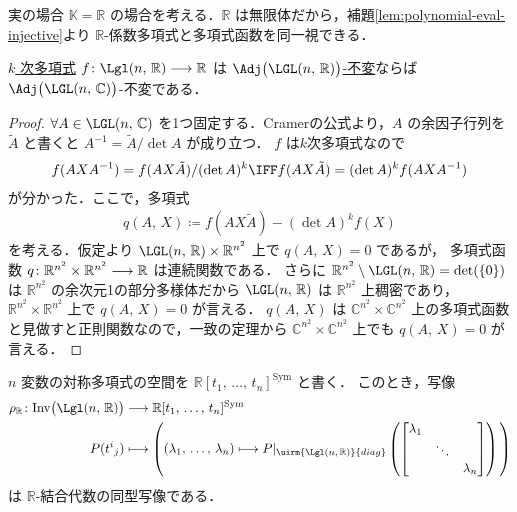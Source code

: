 \documentclass[TQFT_main]{subfiles}
\begin{document}
\begin{myexample}[label=case:real]{実の場合}
    $\mathbb{K} = \mathbb{R}$ の場合を考える．$\mathbb{R}$ は無限体だから，補題\ref{lem:polynomial-eval-injective}より $\mathbb{R}$-係数多項式と多項式函数を同一視できる．

    \begin{mylem}[label=lem:RtoC]{}
        \hyperref[def:polynomial]{$k$ 次多項式} $f \colon \Lgl(n,\, \mathbb{R}) \lto \mathbb{R}$ は
        \hyperref[def:invariant]{$\Adj\bigl(\LGL(n,\, \mathbb{R})\bigr)$-不変}ならば
        $\Adj\bigl(\LGL(n,\, \mathbb{C})\bigr)$-不変である．
    \end{mylem}
    
    \begin{proof}
        $\forall A \in \LGL(n,\, \mathbb{C})$ を1つ固定する．Cramerの公式より，$A$ の余因子行列を $\tilde{A}$ と書くと $A^{-1} = \tilde{A}/\det A$ が成り立つ．
        $f$ は$k$次多項式なので
        \begin{align}
            f(AXA^{-1}) = f(AX \tilde{A}) / (\det A)^k \IFF f(AX \tilde{A}) = (\det A)^k f(AXA^{-1})
        \end{align}
        が分かった．ここで，多項式
        \begin{align}
            q(A,\, X) \coloneqq f(AX\tilde{A}) - (\det A)^k f(X)
        \end{align}
        を考える．仮定より $\LGL(n,\, \mathbb{R}) \times \mathbb{R}^{n^2}$ 上で $q(A,\, X) = 0$ であるが，
        多項式函数 $q \colon \mathbb{R}^{n^2} \times \mathbb{R}^{n^2} \longrightarrow \mathbb{R}$ は連続関数である．
        さらに $\mathbb{R}^{n^2} \setminus \LGL(n,\, \mathbb{R}) = \det(\{0\})$ は $\mathbb{R}^{n^2}$ の余次元1の部分多様体だから $\LGL(n,\, \mathbb{R})$ は $\mathbb{R}^{n^2}$ 上稠密であり，$\mathbb{R}^{n^2} \times \mathbb{R}^{n^2}$ 上で $q(A,\, X) = 0$ が言える．
        $q(A,\, X)$ は $\mathbb{C}^{n^2} \times \mathbb{C}^{n^2}$ 上の多項式函数と見做すと正則関数なので，一致の定理から $\mathbb{C}^{n^2} \times \mathbb{C}^{n^2}$ 上でも $q(A,\, X) = 0$ が言える．
    \end{proof}
    
    
    \begin{myprop}[label=prop:inv-real]{}
        $n$ 変数の対称多項式の空間を $\mathbb{R}[t_1,\,\dots,\, t_n]^{\mathrm{Sym}}$ と書く．
        このとき，写像
        \begin{align}
            \rho_{\mathbb{R}} \colon \mathrm{Inv} \bigl( \Lgl(n,\, \mathbb{R}) \bigr) &\lto \mathbb{R}[t_1,\,\dots,\, t_n]^{\mathrm{Sym}} \\
            P(t^i{}_j) &\lmto \left( (\lambda_1,\,\dots,\, \lambda_n) \lmto P|_{\uirm{\Lgl(n,\, \mathbb{R})}{diag}} \left(\mqty[\dmat{\lambda_1,\ddots,\lambda_n}] \right)\, \right)
        \end{align}
        は $\mathbb{R}$-結合代数の同型写像である．
    \end{myprop}


\end{myexample}
\end{document}
